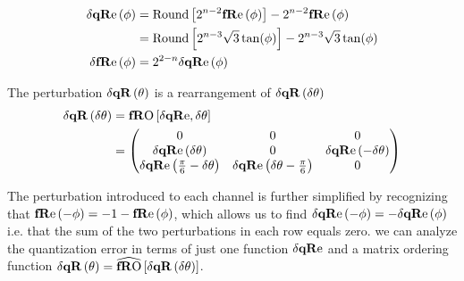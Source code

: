 \begin{align*}
\dqRe[\phi] &= \text{Round}\left[ 2^{n-2} \fRe[\phi ] \right]-2^{n-2}\fRe[\phi ] \\
&=  \text{Round}\left[ 2^{n-3}\sqrt{3} \tan (\phi ) \right]-2^{n-3}\sqrt{3} \tan (\phi )\\
\dfRe[\phi] &= 2^{2-n} \dqRe[\phi]  
\end{align*}

The perturbation $\dqR[\theta]$ is a rearrangement of $\dqR[\thetaA] $ 
\begin{align*}
\dqR[\thetaA] &= \fRO[\dqRe, \thetaA ] \\
 &=
\begin{pmatrix}
 0                                     & 0                                   & 0                     \\
 \dqRe[ \thetaA ]              & 0                                   & \dqRe[ -\thetaA ] \\
 \dqRe[ \Pii{6} -\thetaA]   & \dqRe[\thetaA-\Pii{6} ] & 0                     \\
\end{pmatrix}
\end{align*}

The perturbation introduced to each channel is further simplified by recognizing that $\fRe[-\phi]=-1-\fRe[\phi]$, which allows us to find $\dqRe[-\phi]=-\dqRe[\phi]$ i.e. that the sum of the two perturbations in each row equals zero. we can analyze the quantization error in terms of just one function $\dqRe$ and a matrix ordering function $\dqR[\theta] = \fROm \left[ \dqR[ \thetaA ]  \right]$.


\newcommand\dqEO[1][]{
  \ifstrempty{#1}{
    \widehat{\mathbf{\delta qE}\text{O}}
  }{
    \widehat{\mathbf{\delta qE}\text{O}}\left[#1\right]
  }
}

\newcommand\dqs[1][]{
  \ifstrempty{#1}{
    \mathbf{\delta qS}
  }{
    \mathbf{\delta qS}\left(#1\right)
  }
}

